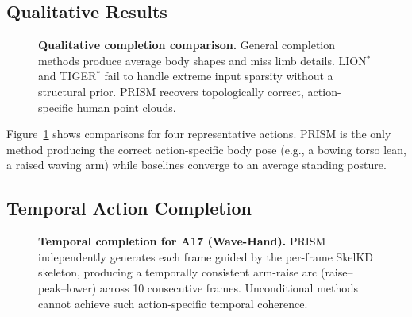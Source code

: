 \documentclass{article}
\begin{document}
\subsection{Qualitative Results}
\label{sec:qual}

\begin{figure}[t]
  \centering
  \caption{
    \textbf{Qualitative completion comparison.}
    General completion methods produce average body shapes and miss limb details.
    LION$^*$ and TIGER$^*$ fail to handle extreme input sparsity without a
    structural prior.
    PRISM recovers topologically correct, action-specific human point clouds.
  }
  \label{fig:qual}
\end{figure}

Figure~\ref{fig:qual} shows comparisons for four representative actions.
PRISM is the only method producing the correct action-specific body pose
(e.g., a bowing torso lean, a raised waving arm) while baselines converge to
an average standing posture.

\subsection{Temporal Action Completion}
\label{sec:temporal}

\begin{figure}[t]
  \centering
  \caption{
    \textbf{Temporal completion for A17 (Wave-Hand).}
    PRISM independently generates each frame guided by the per-frame SkelKD
    skeleton, producing a temporally consistent arm-raise arc (raise--peak--lower)
    across 10 consecutive frames.
    Unconditional methods cannot achieve such action-specific temporal coherence.
  }
  \label{fig:temporal}
\end{figure}
\end{document}
